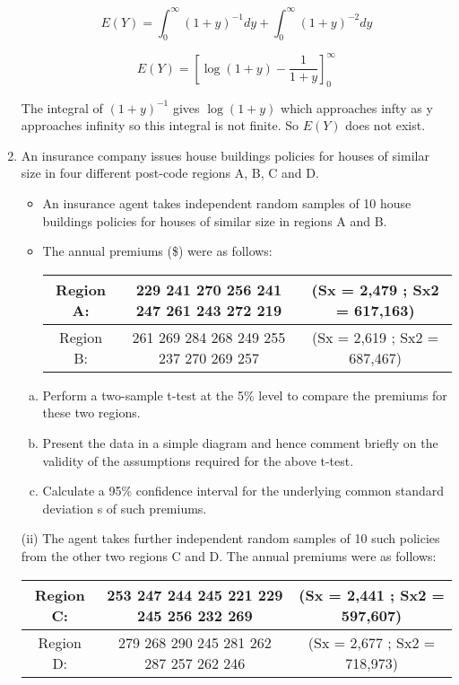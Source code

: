 \documentclass[a4paper,12pt]{article}
\begin{document}
\begin{enumerate}
\begin{framed}
\end{framed}

\[E(Y) = \int^{\infty}_{0} (1+y)^{-1} dy  + \int^{\infty}_{0} (1+y)^{-2} dy  \]

\[E(Y) = \left[ \log(1+y) - \frac{1}{1+y} \right]^{\infty}_{0}\]



The integral of $(1 + y)^{-1}$ gives $\log(1 + y)$ which approaches infty as y approaches infinity so this
integral is not finite. So $E(Y)$ does not exist.
\newpage
\item An insurance company issues house buildings policies for houses of similar
size in four different post-code regions A, B, C and D.
\begin{itemize}
\item  An insurance agent takes independent random samples of 10 house
buildings policies for houses of similar size in regions A and B.
\item The
annual premiums (\$) were as follows:

\begin{center}
 \begin{tabular}{c|c|c}\hline
Region A: & 229 241 270 256 241 247 261 243 272 219
& (Sx = 2,479 ; Sx2 = 617,163)\\  \hline
Region B: & 261 269 284 268 249 255 237 270 269 257
& (Sx = 2,619 ; Sx2 = 687,467)\\  \hline
\end{tabular}   
\end{center}

\end{itemize}
\begin{enumerate}[(a)]
\item Perform a two-sample t-test at the 5\% level to compare the
premiums for these two regions.
\item Present the data in a simple diagram and hence comment briefly
on the validity of the assumptions required for the above t-test.
\item Calculate a 95\% confidence interval for the underlying common
standard deviation s of such premiums. 
\end{enumerate}
(ii) The agent takes further independent random samples of 10 such
policies from the other two regions C and D. The annual premiums
were as follows:
\begin{center}
 \begin{tabular}{c|c|c}\hline
Region C: & 253 247 244 245 221 229 245 256 232 269
& (Sx = 2,441 ; Sx2 = 597,607)\\  \hline
Region D:&  279 268 290 245 281 262 287 257 262 246
& (Sx = 2,677 ; Sx2 = 718,973)\\  \hline
\end{tabular}   
\end{center}



\end{enumerate}
\end{document}
